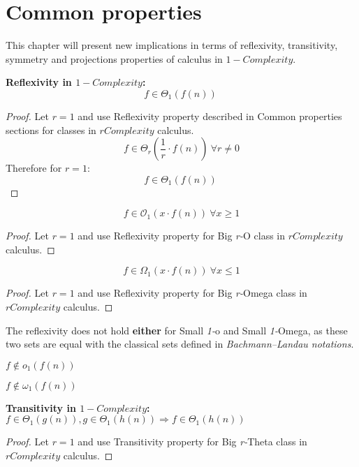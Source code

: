 \section{Common properties}
This chapter will present new implications in terms of reflexivity, transitivity, symmetry and projections properties of calculus in $1-Complexity$.
\begin{theorem} 
\textbf{Reflexivity in $1-Complexity$:}  \[ f \in \Theta_{1} \left( f(n) \right)\ \]
\end{theorem} 
\begin{proof} 
   Let $r = 1$ and use Reflexivity property described in Common properties sections for classes in $rComplexity$ calculus.
   \[ f \in \Theta_{r} \left( \frac{1}{r} \cdot f(n) \right)\ \forall r \neq 0 \]
   Therefore for $r = 1$:
 \[ f \in \Theta_{1} \left( f(n) \right)\ \]
\end{proof} 
 
 \begin{theorem} 
 \[ f \in \mathcal{O}_{1} \left( x \cdot f(n) \right)\ \forall x \geq 1 \]
\end{theorem} 
\begin{proof} 
   Let $r = 1$ and use Reflexivity property for Big \textit{r-}O class in $rComplexity$ calculus.
\end{proof} 

\begin{theorem} 
 \[ f \in \Omega_{1} \left( x \cdot f(n) \right)\ \forall x \leq 1 \]
\end{theorem} 
\begin{proof} 
   Let $r = 1$ and use Reflexivity property for Big \textit{r-}Omega class in $rComplexity$ calculus.
\end{proof} 


The reflexivity does not hold \textbf{either} for Small \textit{1-}o and Small \textit{1-}Omega, as these two sets are equal with the classical sets defined in \textit{Bachmann–Landau notations}.
\begin{theorem} 
$ f \notin o_{1}(f(n)) $ 
\end{theorem} 
\begin{theorem} 
$ f \notin \omega_{1}(f(n)) $ 
\end{theorem} 

\begin{theorem} 
 \textbf{Transitivity in $1-Complexity$:}  \\  $ f \in \Theta_{1}(g(n)),  g \in \Theta_{1}(h(n)) \Rightarrow  f \in \Theta_{1}(h(n))$   
 \end{theorem} 
\begin{proof} 
   Let $r = 1$ and use Transitivity property for Big \textit{r-}Theta class in $rComplexity$ calculus.
\end{proof} 

